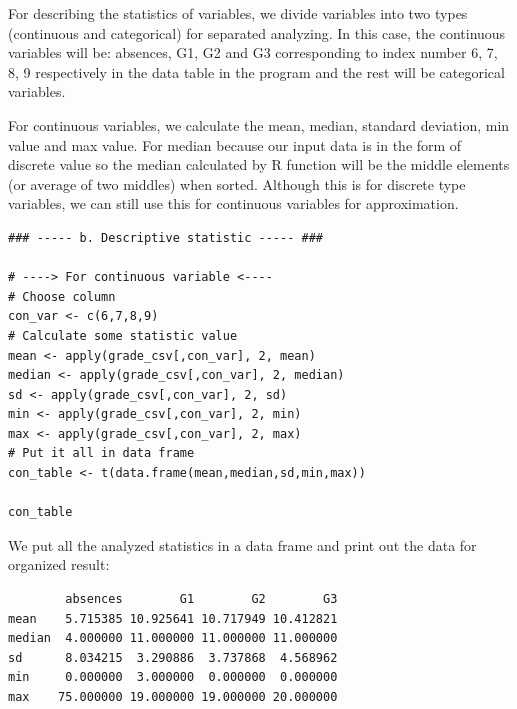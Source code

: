 \documentclass[a4paper]{article}
\newcounter{subsubsubsection}[subsubsection]
\numberwithin{equation}{section}
\begin{document}
For describing the statistics of variables, we divide variables into two types (continuous and categorical) for separated analyzing. In this case, the continuous variables will be: absences, G1, G2 and G3 corresponding to index number 6, 7, 8, 9 respectively in the data table in the program and the rest will be categorical variables.

For continuous variables, we calculate the mean, median, standard deviation, min value and max value. For median because our input data is in the form of discrete value so the median calculated by R function will be the middle elements (or average of two middles) when sorted. Although this is for discrete type variables, we can still use this for continuous variables for approximation.

\begin{mdframed}[leftline=false,rightline=false,backgroundcolor=magenta!10,nobreak=true]
  \begin{verbatim}
### ----- b. Descriptive statistic ----- ###

# ----> For continuous variable <----
# Choose column
con_var <- c(6,7,8,9)
# Calculate some statistic value
mean <- apply(grade_csv[,con_var], 2, mean)
median <- apply(grade_csv[,con_var], 2, median)
sd <- apply(grade_csv[,con_var], 2, sd)
min <- apply(grade_csv[,con_var], 2, min)
max <- apply(grade_csv[,con_var], 2, max)
# Put it all in data frame
con_table <- t(data.frame(mean,median,sd,min,max))

con_table
  \end{verbatim}
\end{mdframed}

We put all the analyzed statistics in a data frame and print out the data for organized result:
\begin{mdframed}[leftline=false,rightline=false,backgroundcolor=teal!10,nobreak=true]
  \begin{verbatim}
        absences        G1        G2        G3
mean    5.715385 10.925641 10.717949 10.412821
median  4.000000 11.000000 11.000000 11.000000
sd      8.034215  3.290886  3.737868  4.568962
min     0.000000  3.000000  0.000000  0.000000
max    75.000000 19.000000 19.000000 20.000000
  \end{verbatim}
\end{mdframed}
\end{document}
